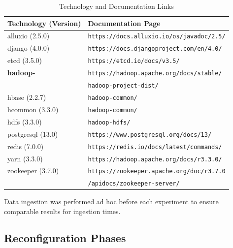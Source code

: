 \begin{table}[h]
    \centering
    \begin{tabular}{|l|l|}
        \hline
        \textbf{Technology (Version)} & \textbf{Documentation Page} \\
        \hline
        alluxio (2.5.0) & \texttt{https://docs.alluxio.io/os/javadoc/2.5/} \\
        django (4.0.0) & \texttt{https://docs.djangoproject.com/en/4.0/} \\
        etcd (3.5.0) & \texttt{https://etcd.io/docs/v3.5/} \\
        \textbf{hadoop-} & \texttt{https://hadoop.apache.org/docs/stable/}\\
        & \hspace{0.25cm} \texttt{hadoop-project-dist/} \\
        \hspace{0.15cm} hbase (2.2.7) & \hspace{0.5cm} \texttt{hadoop-common/} \\
        \hspace{0.15cm} hcommon (3.3.0) & \hspace{0.5cm} \texttt{hadoop-common/} \\
        \hspace{0.15cm} hdfs (3.3.0) & \hspace{0.5cm} \texttt{hadoop-hdfs/} \\
        postgresql (13.0) & \texttt{https://www.postgresql.org/docs/13/} \\
        redis (7.0.0) & \texttt{https://redis.io/docs/latest/commands/} \\
        yarn (3.3.0) & \texttt{https://hadoop.apache.org/docs/r3.3.0/} \\
        zookeeper (3.7.0) & \texttt{https://zookeeper.apache.org/doc/r3.7.0} \\
        & \hspace{0.25cm} \texttt{/apidocs/zookeeper-server/} \\
        \hline
    \end{tabular}
    \caption{Technology and Documentation Links}
    \label{tab:technology_documentation}
\end{table}

Data ingestion was performed ad hoc before each experiment to ensure comparable results for ingestion times.

\subsection{Reconfiguration Phases} \label{sec:exp_results} 


